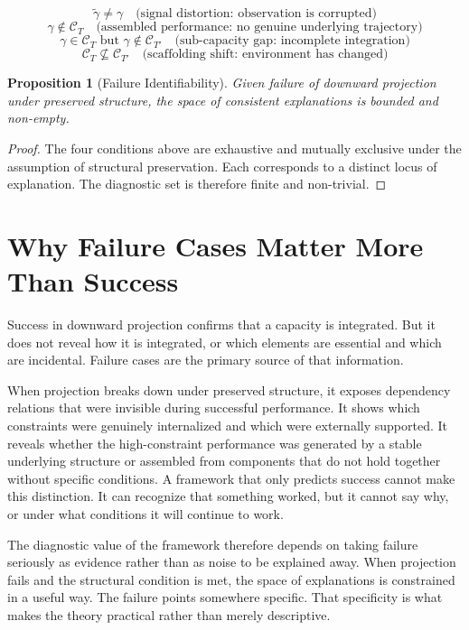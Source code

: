 \documentclass[12pt, a4paper]{article}
\newtheorem{proposition}[definition]{Proposition}
\begin{document}
\[
\tilde{\gamma} \neq \gamma \quad \text{(signal distortion: observation is corrupted)}
\]
\[
\gamma \notin \mathcal{C}_T \quad \text{(assembled performance: no genuine underlying trajectory)}
\]
\[
\gamma \in \mathcal{C}_T \text{ but } \gamma \notin \mathcal{C}_{T'} \quad \text{(sub-capacity gap: incomplete integration)}
\]
\[
\mathcal{C}_T \not\subseteq \mathcal{C}_{T'} \quad \text{(scaffolding shift: environment has changed)}
\]

\begin{proposition}[Failure Identifiability]
Given failure of downward projection under preserved structure, the space of consistent explanations is bounded and non-empty.
\end{proposition}

\begin{proof}
The four conditions above are exhaustive and mutually exclusive under the assumption of structural preservation. Each corresponds to a distinct locus of explanation. The diagnostic set is therefore finite and non-trivial.
\end{proof}


\section{Why Failure Cases Matter More Than Success}

Success in downward projection confirms that a capacity is integrated. But it does not reveal how it is integrated, or which elements are essential and which are incidental. Failure cases are the primary source of that information.

When projection breaks down under preserved structure, it exposes dependency relations that were invisible during successful performance. It shows which constraints were genuinely internalized and which were externally supported. It reveals whether the high-constraint performance was generated by a stable underlying structure or assembled from components that do not hold together without specific conditions. A framework that only predicts success cannot make this distinction. It can recognize that something worked, but it cannot say why, or under what conditions it will continue to work.

The diagnostic value of the framework therefore depends on taking failure seriously as evidence rather than as noise to be explained away. When projection fails and the structural condition is met, the space of explanations is constrained in a useful way. The failure points somewhere specific. That specificity is what makes the theory practical rather than merely descriptive.
\end{document}
